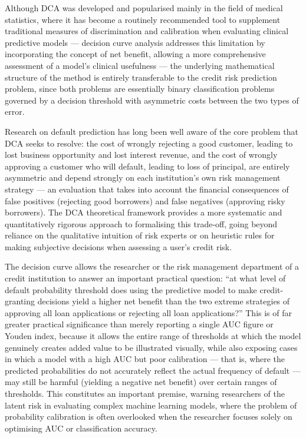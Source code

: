 Although DCA was developed and popularised mainly in the field of medical statistics, where it has become a routinely recommended tool to supplement traditional measures of discrimination and calibration when evaluating clinical predictive models — decision curve analysis addresses this limitation by incorporating the concept of net benefit, allowing a more comprehensive assessment of a model's clinical usefulness \cite{vickers2006decision} — the underlying mathematical structure of the method is entirely transferable to the credit risk prediction problem, since both problems are essentially binary classification problems governed by a decision threshold with asymmetric costs between the two types of error.

Research on default prediction has long been well aware of the core problem that DCA seeks to resolve: the cost of wrongly rejecting a good customer, leading to lost business opportunity and lost interest revenue, and the cost of wrongly approving a customer who will default, leading to loss of principal, are entirely asymmetric and depend strongly on each institution's own risk management strategy — an evaluation that takes into account the financial consequences of false positives (rejecting good borrowers) and false negatives (approving risky borrowers). The DCA theoretical framework provides a more systematic and quantitatively rigorous approach to formalising this trade-off, going beyond reliance on the qualitative intuition of risk experts or on heuristic rules for making subjective decisions when assessing a user's credit risk.


The decision curve allows the researcher or the risk management department of a credit institution to answer an important practical question: ``at what level of default probability threshold does using the predictive model to make credit-granting decisions yield a higher net benefit than the two extreme strategies of approving all loan applications or rejecting all loan applications?'' This is of far greater practical significance than merely reporting a single AUC figure or Youden index, because it allows the entire range of thresholds at which the model genuinely creates added value to be illustrated visually, while also exposing cases in which a model with a high AUC but poor calibration — that is, where the predicted probabilities do not accurately reflect the actual frequency of default — may still be harmful (yielding a negative net benefit) over certain ranges of thresholds. This constitutes an important premise, warning researchers of the latent risk in evaluating complex machine learning models, where the problem of probability calibration is often overlooked when the researcher focuses solely on optimising AUC or classification accuracy.











